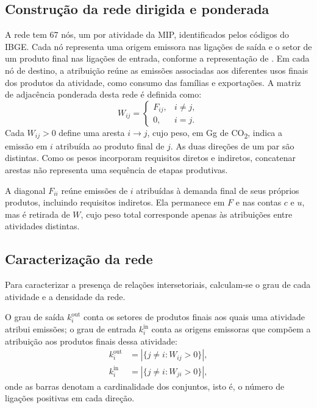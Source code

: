 \subsection{Construção da rede dirigida e ponderada}
\label{sec:construcao-rede}

A rede tem 67 nós, um por atividade da MIP, identificados pelos códigos do IBGE. Cada nó representa uma origem emissora nas ligações de saída e o setor de um produto final nas ligações de entrada, conforme a representação de \textcite{huang2019}. Em cada nó de destino, a atribuição reúne as emissões associadas aos diferentes usos finais dos produtos da atividade, como consumo das famílias e exportações. A matriz de adjacência ponderada desta rede é definida como:
\begin{equation}
W_{ij}=\begin{cases}
F_{ij}, & i\ne j,\\
0, & i=j.
\end{cases}
\label{eq:rede-sem-diagonal}
\end{equation}
Cada $W_{ij}>0$ define uma aresta $i\rightarrow j$, cujo peso, em Gg de CO\textsubscript{2}, indica a emissão em $i$ atribuída ao produto final de $j$. As duas direções de um par são distintas. Como os pesos incorporam requisitos diretos e indiretos, concatenar arestas não representa uma sequência de etapas produtivas.

A diagonal $F_{ii}$ reúne emissões de $i$ atribuídas à demanda final de seus próprios produtos, incluindo requisitos indiretos. Ela permanece em $F$ e nas contas $c$ e $u$, mas é retirada de $W$, cujo peso total corresponde apenas às atribuições entre atividades distintas.

\subsection{Caracterização da rede}
\label{sec:volume-concentracao}

Para caracterizar a presença de relações intersetoriais, calculam-se o grau de cada atividade e a densidade da rede.

O grau de saída $k_i^{\mathrm{out}}$ conta os setores de produtos finais aos quais uma atividade atribui emissões; o grau de entrada $k_i^{\mathrm{in}}$ conta as origens emissoras que compõem a atribuição aos produtos finais dessa atividade:
\begin{equation}
\begin{aligned}
k_i^{\mathrm{out}}&=\left|\{j\ne i:W_{ij}>0\}\right|,\\
k_i^{\mathrm{in}}&=\left|\{j\ne i:W_{ji}>0\}\right|, 
\end{aligned}
\label{eq:graus-rede}
\end{equation}
onde as barras denotam a cardinalidade dos conjuntos, isto é, o número de ligações positivas em cada direção.

